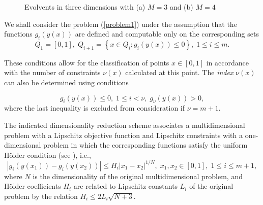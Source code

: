 \documentclass[
11pt,%
tightenlines,%
twoside,%
onecolumn,%
nofloats,%
nobibnotes,%
nofootinbib,%
superscriptaddress,%
noshowpacs,%
centertags]%
{revtex4}
\begin{document}
\begin{figure}
\begin{minipage}{0.4\linewidth}
\end{minipage}
\caption{Evolvents in three dimensions with (a) $M=3$ and (b) $M=4$}
\label{evolvents}
\end{figure}

We shall consider the problem (\ref{problem1}) under the assumption that the functions $g_i(y(x))$ are defined and computable only on the corresponding sets
\[
Q_1=[0,1], \; Q_{i+1}=\left\{x \in Q_i : g_i(y(x)) \leq 0 \right\}, \; 1 \leq i \leq m.
\]

These conditions allow for the classification of points $x \in [0,1]$ in accordance with the number of constraints $\nu(x)$  calculated at this point. The \textit{index} $\nu(x)$ can also be determined using conditions

\begin{equation}\label{nu}
g_i(y(x)) \leq 0, \; 1 \leq i < \nu, \; g_\nu(y(x))>0,
\end{equation}
where the last inequality is excluded from consideration if  $\nu=m+1$.

The indicated dimensionality reduction scheme associates a multidimensional problem with a Lipschitz objective function and Lipschitz constraints with a one-dimensional problem in which the corresponding functions satisfy the uniform  H{\"o}lder condition (see \cite{Sergeyev2013}), i.e.,
\[
\left|g_i(y(x_1))-g_i (y(x_2))\right| \leq H_i \left|x_1-x_2 \right|^{1/N}, \; x_1,x_2\in [0,1], \; 1\leq i \leq m+1,
\]
where $N$ is the dimensionality of the original multidimensional problem, and H{\"o}lder coefficients $H_i$ are related to Lipschitz constants $L_i$ of the original problem by the relation  $H_i \leq 2L_i \sqrt{N+3}$.
\end{document}
